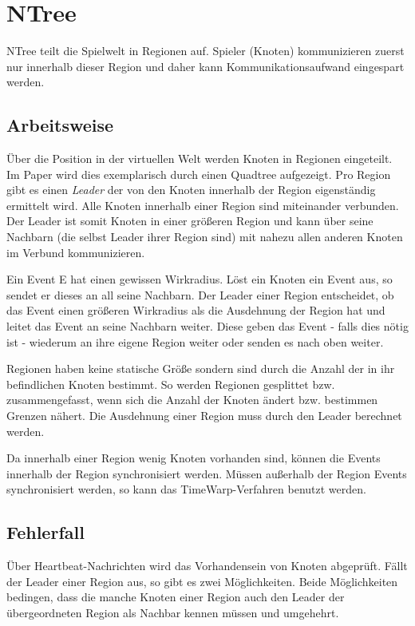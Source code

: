 \section{NTree}
NTree \label{chap:related:ntree} teilt die Spielwelt in Regionen auf. Spieler (Knoten) kommunizieren zuerst nur innerhalb dieser Region und daher kann Kommunikationsaufwand eingespart werden.

\subsection{Arbeitsweise}
Über die Position in der virtuellen Welt werden Knoten in Regionen eingeteilt. Im Paper wird dies exemplarisch durch einen Quadtree aufgezeigt. Pro Region gibt es einen \emph{Leader} der von den Knoten innerhalb der Region eigenständig ermittelt wird. Alle Knoten innerhalb einer Region sind miteinander verbunden. Der Leader ist somit Knoten in einer größeren Region und kann über seine Nachbarn (die selbst Leader ihrer Region sind) mit nahezu allen anderen Knoten im Verbund kommunizieren.

Ein Event E hat einen gewissen Wirkradius.
Löst ein Knoten ein Event aus, so sendet er dieses an all seine Nachbarn. Der Leader einer Region entscheidet, ob das Event einen größeren Wirkradius als die Ausdehnung der Region hat und leitet das Event an seine Nachbarn weiter. Diese geben das Event - falls dies nötig ist - wiederum an ihre eigene Region weiter oder senden es nach oben weiter.

Regionen haben keine statische Größe sondern sind durch die Anzahl der in ihr befindlichen Knoten bestimmt. So werden Regionen gesplittet bzw. zusammengefasst, wenn sich die Anzahl der Knoten ändert bzw. bestimmen Grenzen nähert. Die Ausdehnung einer Region muss durch den Leader berechnet werden.

Da innerhalb einer Region wenig Knoten vorhanden sind, können die Events innerhalb der Region synchronisiert werden. Müssen außerhalb der Region Events synchronisiert werden, so kann das TimeWarp-Verfahren benutzt werden.


\subsection{Fehlerfall}
Über Heartbeat-Nachrichten wird das Vorhandensein von Knoten abgeprüft. Fällt der Leader einer Region aus, so gibt es zwei Möglichkeiten. Beide Möglichkeiten bedingen, dass die manche Knoten einer Region auch den Leader der übergeordneten Region als Nachbar kennen müssen und umgehehrt.

